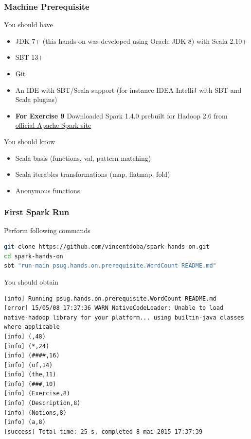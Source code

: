 \documentclass[slidetop,9pt,utf8]{beamer}
\begin{document}
\begin{frame}
  \frametitle{Machine Prerequisite}

  \begin{block}{You should have}
    \begin{itemize}
      \item JDK 7+ (this hands on was developed using Oracle JDK 8) with Scala 2.10+
      \item SBT 13+
      \item Git
      \item An IDE with SBT/Scala support (for instance IDEA IntelliJ with SBT and Scala plugins)
      \item \textbf{For Exercise 9} Downloaded Spark 1.4.0 prebuilt for Hadoop 2.6 from \href{http://www.apache.org/dyn/closer.cgi/spark/spark-1.4.0/spark-1.4.0-bin-hadoop2.6.tgz}{official Apache Spark site}
    \end{itemize}
  \end{block}

  \begin{block}{You should know}
    \begin{itemize}
      \item Scala basis (functions, val, pattern matching)
      \item Scala iterables transformations (map, flatmap, fold)
      \item Anonymous functions
    \end{itemize}
  \end{block}

\end{frame}

\begin{frame}[fragile]
  \frametitle{First Spark Run}

  \begin{block}{Perform following commands}
    \begin{lstlisting}[language=bash, style=terminal-medium]
git clone https://github.com/vincentdoba/spark-hands-on.git
cd spark-hands-on
sbt "run-main psug.hands.on.prerequisite.WordCount README.md" 
    \end{lstlisting}
  \end{block}

  \begin{block}{You should obtain}
    \begin{lstlisting}[style=terminal]
[info] Running psug.hands.on.prerequisite.WordCount README.md
[error] 15/05/08 17:37:36 WARN NativeCodeLoader: Unable to load native-hadoop library for your platform... using builtin-java classes where applicable
[info] (,48)
[info] (*,24)
[info] (####,16)
[info] (of,14)
[info] (the,11)
[info] (###,10)
[info] (Exercise,8)
[info] (Description,8)
[info] (Notions,8)
[info] (a,8)
[success] Total time: 25 s, completed 8 mai 2015 17:37:39
    \end{lstlisting}
  \end{block}

\end{frame}
\end{document}
